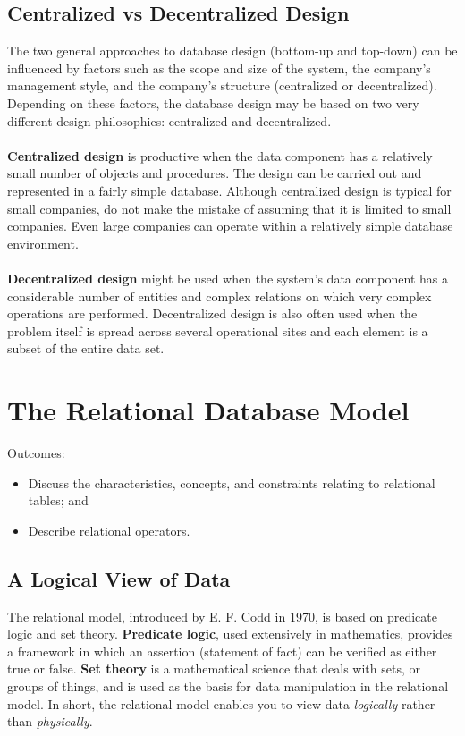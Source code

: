 \documentclass[a4paper, 12pt, titlepage]{report}
\begin{document}
\section{Centralized vs Decentralized Design}
The two general approaches to database design (bottom-up and top-down) can be influenced by factors such as the scope and size of the system, the company’s management style, and the company’s structure (centralized or decentralized). Depending on these factors, the database design may be based on two very different design philosophies: centralized and decentralized. \\
\\ \textbf{Centralized design} is productive when the data component has a relatively small number of objects and procedures. The design can be carried out and represented in a
fairly simple database. Although centralized design is typical for small companies, do not make the mistake of assuming that it is limited to small companies. Even large companies can operate within a relatively simple database environment. \\
\\ \textbf{Decentralized design} might be used when the system’s data component has a considerable number of entities and complex relations on which very complex operations are performed. Decentralized design is also often used when the problem itself is spread across several operational sites and each element is a subset of the entire data set.

\chapter{The Relational Database Model}
Outcomes:
\begin{itemize}
\item Discuss the characteristics, concepts, and constraints relating to relational tables; and
\item Describe relational operators.
\end{itemize}
\section{A Logical View of Data}
The relational model, introduced by E. F. Codd in 1970, is based on predicate logic and set theory. \textbf{Predicate logic}, used extensively in mathematics, provides a framework in which an assertion (statement of fact) can be verified as either true or false. \textbf{Set theory} is a mathematical science that deals with sets, or groups of things, and is used as the basis for data manipulation in the relational model. In short, the relational model enables you to view data \emph{logically} rather than \emph{physically}.
\end{document}
